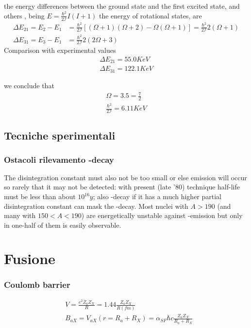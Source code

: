 the energy differences between the ground state and the first excited state, and others ,
being $E=\frac{\hbar^2}{2\mathcal{I}}I(I+1)$ the energy of rotational states, are
\begin{align*}
\Delta E_{21}=E_2-E_1&=\frac{\hbar^2}{2\mathcal{I}}[(\Omega+1)(\Omega+2)-\Omega(\Omega+1)]=\frac{\hbar^2}{2\mathcal{I}}2(\Omega+1)\\
\Delta E_{31}=E_3-E_1&=\frac{\hbar^2}{2\mathcal{I}}2(2\Omega+3)
\end{align*}
Comparison with experimental values
\begin{align*}
\Delta E_{21}=55.0 KeV\\
\Delta E_{31}=122.1 KeV
\end{align*}

we conclude that 
\begin{align*}
\Omega=3.5=\frac{7}{2}\\
\frac{\hbar^2}{2\mathcal{I}}=6.11 KeV
\end{align*}

\section{Tecniche sperimentali}
\subsection{Ostacoli rilevamento \Ra-decay}
The disintegration constant must also not be too small or else \Ra emission will occur so rarely that it may not be detected: with present (late '80) technique half-life must be less than about $10^{16} y$; also \Rb-decay if it has a much higher partial disintegration constant can mask the \Ra-decay. Most nuclei with $A>190$ (and many with $150<A<190$) are energetically unstable against \Ra-emission but only in one-half of them is easily observable.


\chapter{Fusione}


\subsection{Coulomb barrier}
\begin{align*}
&V=\frac{e^2Z_aZ_X}{R}=1.44\frac{Z_aZ_X}{R(fm)}\\
&B_{aX}=V_{aX}(r=R_a+R_X)=\alpha_{SF}\hbar c\frac{Z_aZ_X}{R_a+R_X}
\end{align*}

